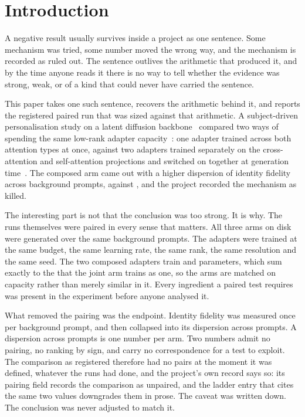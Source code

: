 \section{Introduction}

A negative result usually survives inside a project as one sentence. Some
mechanism was tried, some number moved the wrong way, and the mechanism is
recorded as ruled out. The sentence outlives the arithmetic that produced it,
and by the time anyone reads it there is no way to tell whether the evidence
was strong, weak, or of a kind that could never have carried the sentence.

This paper takes one such sentence, recovers the arithmetic behind it, and
reports the registered paired run that was sized against that arithmetic. A
subject-driven personalisation study on a latent diffusion
backbone~\cite{rombach2022ldm,ruiz2023dreambooth} compared two ways of spending
the same low-rank adapter capacity~\cite{hu2022lora}: one adapter trained
across both attention types at once, against two adapters trained separately on
the cross-attention and self-attention projections and switched on together at
generation time~\cite{blora}. The composed arm came out with a higher
dispersion of identity fidelity across background prompts, \DisplayComposed{}
against \DisplayBase{}, and the project recorded the mechanism as killed.

The interesting part is not that the conclusion was too strong. It is why. The
runs themselves were paired in every sense that matters. All three arms on disk
were generated over the same \NPairs{} background prompts. The adapters were
trained at the same budget, the same learning rate, the same rank, the same
resolution and the same seed. The two composed adapters train \CrossParams{}
and \SelfParams{} parameters, which sum exactly to the \JointParams{} that the
joint arm trains as one, so the arms are matched on capacity rather than
merely similar in it. Every ingredient a paired test requires was present in
the experiment before anyone analysed it.

What removed the pairing was the endpoint. Identity fidelity was measured once
per background prompt, and then collapsed into its dispersion across prompts.
A dispersion across prompts is one number per arm. Two numbers admit no
pairing, no ranking by sign, and carry no correspondence for a test to
exploit. The comparison as registered therefore had no pairs at the moment it
was defined, whatever the runs had done, and the project's own record says so:
its pairing field records the comparison as unpaired, and the ladder entry that
cites the same two values downgrades them in prose. The caveat was written
down. The conclusion was never adjusted to match it.


